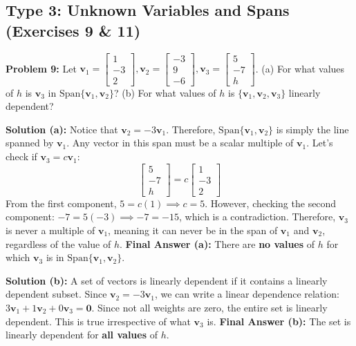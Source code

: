 \documentclass[11pt]{article}
\begin{document}
\subsection{Type 3: Unknown Variables and Spans (Exercises 9 \& 11)}

\textbf{Problem 9:} Let $\mathbf{v}_1 = \begin{bmatrix} 1 \\ -3 \\ 2 \end{bmatrix}, \mathbf{v}_2 = \begin{bmatrix} -3 \\ 9 \\ -6 \end{bmatrix}, \mathbf{v}_3 = \begin{bmatrix} 5 \\ -7 \\ h \end{bmatrix}$. 
(a) For what values of $h$ is $\mathbf{v}_3$ in $\text{Span}\{\mathbf{v}_1, \mathbf{v}_2\}$?
(b) For what values of $h$ is $\{\mathbf{v}_1, \mathbf{v}_2, \mathbf{v}_3\}$ linearly dependent?

\textbf{Solution (a):}
Notice that $\mathbf{v}_2 = -3\mathbf{v}_1$. Therefore, $\text{Span}\{\mathbf{v}_1, \mathbf{v}_2\}$ is simply the line spanned by $\mathbf{v}_1$. Any vector in this span must be a scalar multiple of $\mathbf{v}_1$. 
Let's check if $\mathbf{v}_3 = c\mathbf{v}_1$:
\[ \begin{bmatrix} 5 \\ -7 \\ h \end{bmatrix} = c \begin{bmatrix} 1 \\ -3 \\ 2 \end{bmatrix} \]
From the first component, $5 = c(1) \implies c = 5$. 
However, checking the second component: $-7 = 5(-3) \implies -7 = -15$, which is a contradiction. Therefore, $\mathbf{v}_3$ is never a multiple of $\mathbf{v}_1$, meaning it can never be in the span of $\mathbf{v}_1$ and $\mathbf{v}_2$, regardless of the value of $h$.
\textbf{Final Answer (a):} There are \textbf{no values} of $h$ for which $\mathbf{v}_3$ is in $\text{Span}\{\mathbf{v}_1, \mathbf{v}_2\}$.

\textbf{Solution (b):}
A set of vectors is linearly dependent if it contains a linearly dependent subset. Since $\mathbf{v}_2 = -3\mathbf{v}_1$, we can write a linear dependence relation: $3\mathbf{v}_1 + 1\mathbf{v}_2 + 0\mathbf{v}_3 = \mathbf{0}$. Since not all weights are zero, the entire set is linearly dependent. This is true irrespective of what $\mathbf{v}_3$ is.
\textbf{Final Answer (b):} The set is linearly dependent for \textbf{all values} of $h$.
\end{document}
